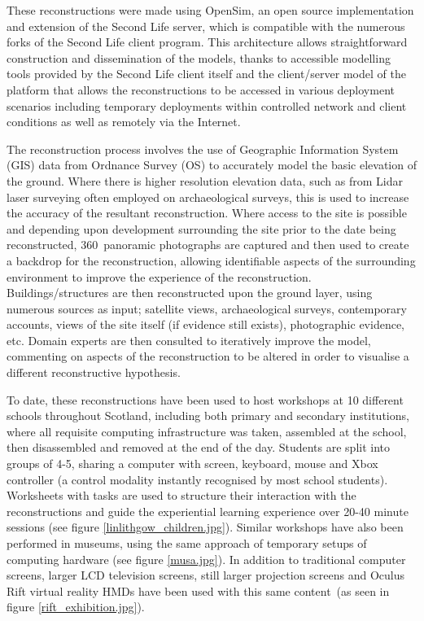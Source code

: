 These reconstructions were made using OpenSim, an open source implementation and extension of the Second Life server, which is compatible with the numerous forks of the Second Life client program. This architecture allows straightforward construction and dissemination of the models, thanks to accessible modelling tools provided by the Second Life client itself and the client/server model of the platform that allows the reconstructions to be accessed in various deployment scenarios including temporary deployments within controlled network and client conditions as well as remotely via the Internet.

The reconstruction process involves the use of Geographic Information System (GIS) data from Ordnance Survey (OS) to accurately model the basic elevation of the ground. Where there is higher resolution elevation data, such as from Lidar laser surveying often employed on archaeological surveys, this is used to increase the accuracy of the resultant reconstruction. Where access to the site is possible and depending upon development surrounding the site prior to the date being reconstructed, 360\textdegree\ panoramic photographs are captured and then used to create a backdrop for the reconstruction, allowing identifiable aspects of the surrounding environment to improve the experience of the reconstruction. Buildings/structures are then reconstructed upon the ground layer, using numerous sources as input; satellite views, archaeological surveys, contemporary accounts, views of the site itself (if evidence still exists), photographic evidence, etc. Domain experts are then consulted to iteratively improve the model, commenting on aspects of the reconstruction to be altered in order to visualise a different reconstructive hypothesis.

To date, these reconstructions have been used to host workshops at 10 different schools throughout Scotland, including both primary and secondary institutions, where all requisite computing infrastructure was taken, assembled at the school, then disassembled and removed at the end of the day. Students are split into groups of 4-5, sharing a computer with screen, keyboard, mouse and Xbox controller (a control modality instantly recognised by most school students). Worksheets with tasks are used to structure their interaction with the reconstructions and guide the experiential learning experience over 20-40 minute sessions (see figure \ref{linlithgow_children.jpg}). Similar workshops have also been performed in museums, using the same approach of temporary setups of computing hardware (see figure \ref{musa.jpg}). In addition to traditional computer screens, larger LCD television screens, still larger projection screens and Oculus Rift virtual reality HMDs have been used with this same content~(as seen in figure \ref{rift_exhibition.jpg}).

